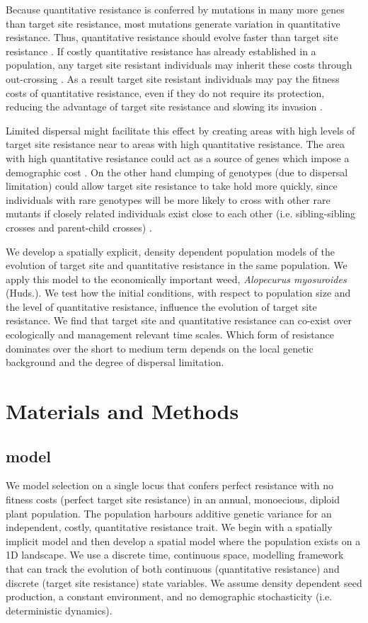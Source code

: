 \documentclass[10pt,letterpaper]{article}
\begin{document}
Because quantitative resistance is conferred by mutations in many more genes \cite{petit2010, Busi2013} than target site resistance, most mutations generate variation in quantitative resistance. Thus, quantitative resistance should evolve faster than target site resistance \cite{Dely2010newPhy}. If costly quantitative resistance has already established in a population, any target site resistant individuals may inherit these costs through out-crossing \cite{Yeam2015}. As a result target site resistant individuals may pay the fitness costs of quantitative resistance, even if they do not require its protection, reducing the advantage of target site resistance and slowing its invasion \cite{Chev2008}. 

Limited dispersal might facilitate this effect by creating areas with high levels of target site resistance near to areas with high quantitative resistance. The area with high quantitative resistance could act as a source of genes which impose a demographic cost \cite{Dely2010, Yeam2015}. On the other hand clumping of genotypes (due to dispersal limitation) could allow target site resistance to take hold more quickly, since individuals with rare genotypes will be more likely to cross with other rare mutants if closely related individuals exist close to each other (i.e. sibling-sibling crosses and parent-child crosses) \cite{Some2017}.

We develop a spatially explicit, density dependent population models of the evolution of target site and quantitative resistance in the same population. We apply this model to the economically important weed, \textit{Alopecurus myosuroides} (Huds.). We test how the initial conditions, with respect to population size and the level of quantitative resistance, influence the  evolution of target site resistance. We find that target site and quantitative resistance can co-exist over ecologically and management relevant time scales. Which form of resistance dominates over the short to medium term depends on the local genetic background and the degree of dispersal limitation. 

\section*{Materials and Methods}
\subsection*{model}
We model selection on a single locus that confers perfect resistance with no fitness costs (perfect target site resistance) in an annual, monoecious, diploid plant population. The population harbours additive genetic variance for an independent, costly, quantitative resistance trait. We begin with a spatially implicit model and then develop a spatial model where the population exists on a 1D landscape. We use a discrete time, continuous space, modelling framework that can track the evolution of both continuous (quantitative resistance) and discrete (target site resistance) state variables. We assume density dependent seed production, a constant environment, and no demographic stochasticity (i.e. deterministic dynamics).      
\end{document}
